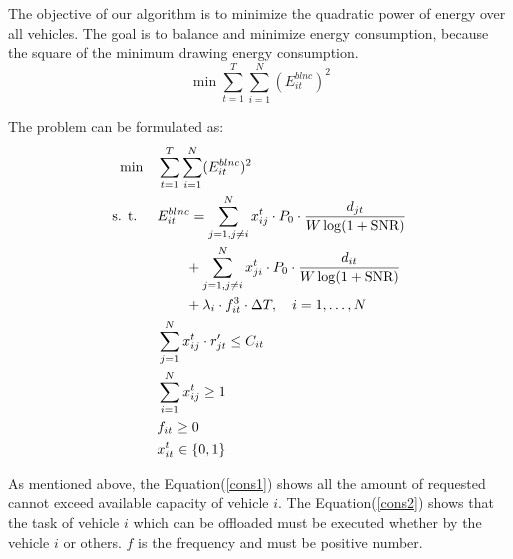 \documentclass[conference]{IEEEtran}
\begin{document}
	The objective of our algorithm is to minimize the quadratic power of energy over all vehicles. The goal is to balance and minimize energy consumption, because the square of the minimum drawing energy consumption. 
	\begin{equation}
		\min\sum \limits _{t=1} ^{T} \sum \limits _{i=1}^{N} (E^{blnc}_{it} )^ 2
	\end{equation}
	
	The problem can be formulated as:  
	\begin{align}  		
		\min  \quad  &\sum \limits _{t=1} ^{T} \sum \limits _{i=1}^{N} (E^{blnc}_{it} )^ 2  \\
		\text{s. t. }   \quad   & 	    	E^{blnc} _{it}=
		\sum \limits_{j=1,  j \ne i}^{N} x _{ij}^{t} \cdot P_0 \cdot \frac{d_{jt}}{W\log (1 + \text{SNR})}  \notag \\
		&\quad \quad +\sum_{j=1 ,j \ne i }^{N} x _{ji}^{t} \cdot P_0 \cdot \frac{d_{it}}{W\log (1 + \text{SNR})}  \notag \\
		&\quad  \quad + \lambda_{i} \cdot f_{it}^{3} \cdot \Delta T
		,\quad i = 1, \dots ,N      \\
		& \sum    _{ j= 1} ^{N}
		{ x_{ij}^{t} \cdot  r'_{jt}} \le C_{it}       \label{cons1}   \\
		& \sum  _{ i= 1} ^N x_{ij}^{t} 	\ge 1  \label{cons2} \\
		&     	f_{it} \ge 0         \label{cons3}\\
		&      x_{it}^{t} \in \{0,1\}	  \label{cons4}
	\end{align} 
	
	As mentioned above, the Equation(\ref{cons1}) shows all the amount of requested cannot exceed available capacity of vehicle $i$. 
	The Equation(\ref{cons2}) shows that the task of vehicle $i$ which can be offloaded must be executed whether by the vehicle $i$ or others. $f$ is the frequency and must be positive number. 
	
\end{document}

